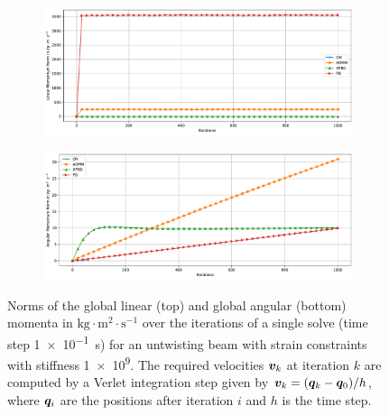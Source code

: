\begin{figure}[h]
    \centering
    \begin{subfigure}{\textwidth}
        \includegraphics[width=\linewidth]{figures/strain_beam_untwist_momenta_large_ts.pdf}
    \end{subfigure}
    \begin{subfigure}{\textwidth}
        \includegraphics[width=\linewidth]{figures/strain_beam_untwist_angular_momenta_large_ts.pdf}
    \end{subfigure}
    \caption{Norms of the global linear (top) and global angular (bottom) momenta in $\text{kg}\cdot\text{m}^2\cdot\text{s}^{-1}$ over the iterations 
    of a single solve (time step \SI{1e-1}{\second}) for an untwisting beam with strain constraints with stiffness \num{1e9}. The required velocities 
    $\bm{v}_k$ at iteration $k$ are computed by a Verlet integration step given by $\bm{v}_k = (\bm{q}_k - \bm{q}_0)/h$, where $\bm{q}_i$ 
    are the positions after iteration $i$ and $h$ is the time step.
}
    \label{fig:strain-beam-untwist-momenta-large-ts}
\end{figure}

